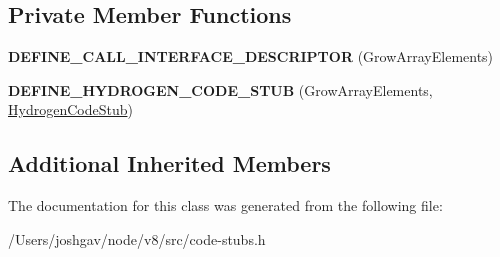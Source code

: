 \subsection*{Private Member Functions}
\begin{DoxyCompactItemize}
\item 
{\bfseries D\+E\+F\+I\+N\+E\+\_\+\+C\+A\+L\+L\+\_\+\+I\+N\+T\+E\+R\+F\+A\+C\+E\+\_\+\+D\+E\+S\+C\+R\+I\+P\+T\+OR} (Grow\+Array\+Elements)\hypertarget{classv8_1_1internal_1_1_grow_array_elements_stub_a95d48353616f6153449f2de7dec83372}{}\label{classv8_1_1internal_1_1_grow_array_elements_stub_a95d48353616f6153449f2de7dec83372}

\item 
{\bfseries D\+E\+F\+I\+N\+E\+\_\+\+H\+Y\+D\+R\+O\+G\+E\+N\+\_\+\+C\+O\+D\+E\+\_\+\+S\+T\+UB} (Grow\+Array\+Elements, \hyperlink{classv8_1_1internal_1_1_hydrogen_code_stub}{Hydrogen\+Code\+Stub})\hypertarget{classv8_1_1internal_1_1_grow_array_elements_stub_a87223411c5594a242e6cc439f3d81028}{}\label{classv8_1_1internal_1_1_grow_array_elements_stub_a87223411c5594a242e6cc439f3d81028}

\end{DoxyCompactItemize}
\subsection*{Additional Inherited Members}


The documentation for this class was generated from the following file\+:\begin{DoxyCompactItemize}
\item 
/\+Users/joshgav/node/v8/src/code-\/stubs.\+h\end{DoxyCompactItemize}
